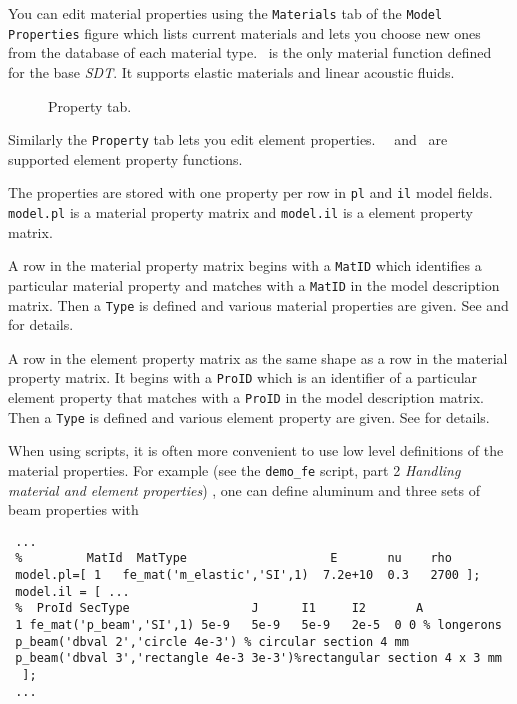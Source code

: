 \begin{SDT}

You can edit material properties using the {\tt Materials} tab of the {\tt Model Properties} figure which lists current materials and lets you choose new ones from the database of each material type. \melastic\ is the only material function defined for the base {\sl SDT}. It supports elastic materials and linear acoustic fluids. 

\begin{figure}[H]
\centering
{}
 \caption{Property tab.}
  \label{fig:matgui}
\end{figure}

Similarly the {\tt Property} tab lets you edit element properties. \pbeam\, \pshell\ and \pspring\ are supported element property functions.

\end{SDT}

The properties are stored with one property per row in {\tt pl} and {\tt il} model fields. {\tt model.pl} is a material property matrix and {\tt model.il} is a element property matrix.

A row in the material property matrix begins with a {\tt MatID} which identifies a particular material property and matches with a {\tt MatID} in the model description matrix. Then a {\tt Type} is defined and various material properties are given. See  and  for details.

A row in the element property matrix as the same shape as a row in the material property matrix. It begins with a {\tt ProID} which is an identifier of a particular element property that matches with a {\tt ProID} in the model description matrix. Then a {\tt Type} is defined and various element property are given. See  for details.

When using scripts, it is often more convenient to use low level definitions
of the material properties. For example (see the {\tt demo\_fe} script, part 2 {\sl Handling material and element properties}) , one can define aluminum and three sets of beam properties with 

\begin{verbatim}
 ...
 %         MatId  MatType                    E       nu    rho
 model.pl=[ 1   fe_mat('m_elastic','SI',1)  7.2e+10  0.3   2700 ];
 model.il = [ ...
 %  ProId SecType                 J      I1     I2       A
 1 fe_mat('p_beam','SI',1) 5e-9   5e-9   5e-9   2e-5  0 0 % longerons
 p_beam('dbval 2','circle 4e-3') % circular section 4 mm
 p_beam('dbval 3','rectangle 4e-3 3e-3')%rectangular section 4 x 3 mm
  ];
 ...
\end{verbatim}

